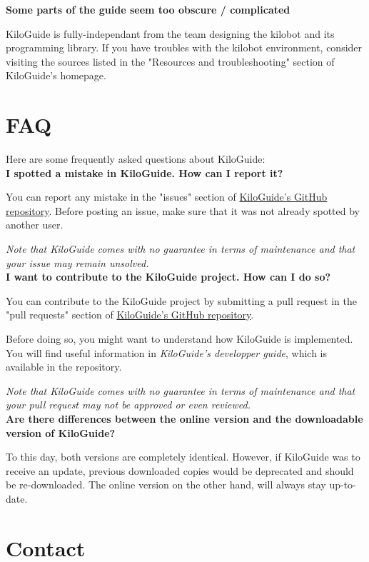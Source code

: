 \documentclass[a4paper,12pt,titlepage]{scrartcl}
\begin{document}
\textbf{Some parts of the guide seem too obscure / complicated}

KiloGuide is fully-independant from the team designing the kilobot and its programming library. If you have troubles with the kilobot environment, consider visiting the sources listed in the "Resources and troubleshooting" section of KiloGuide's homepage.

\section{FAQ}

Here are some frequently asked questions about KiloGuide:\\

\textbf{I spotted a mistake in KiloGuide. How can I report it?}

You can report any mistake in the "issues" section of \href{https://github.com/SimLej18/KiloGuide}{KiloGuide's GitHub repository}. Before posting an issue, make sure that it was not already spotted by another user. 

\emph{Note that KiloGuide comes with no guarantee in terms of maintenance and that your issue may remain unsolved.}\\

\textbf{I want to contribute to the KiloGuide project. How can I do so?}

You can contribute to the KiloGuide project by submitting a pull request in the "pull requests" section of \href{https://github.com/SimLej18/KiloGuide}{KiloGuide's GitHub repository}. 

Before doing so, you might want to understand how KiloGuide is implemented. You will find useful information in \emph{KiloGuide's developper guide}, which is available in the repository.

\emph{Note that KiloGuide comes with no guarantee in terms of maintenance and that your pull request may not be approved or even reviewed.}\\

\textbf{Are there differences between the online version and the downloadable version of KiloGuide?}

To this day, both versions are completely identical. However, if KiloGuide was to receive an update, previous downloaded copies would be deprecated and should be re-downloaded. The online version on the other hand, will always stay up-to-date.

\section{Contact}
\end{document}
